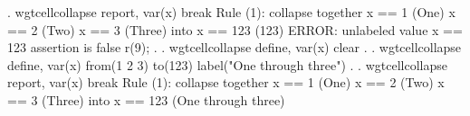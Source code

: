 {\smallskip}
. wgtcellcollapse report, var(x) break
{\smallskip}
Rule (1): collapse together
  x == 1 (One)
  x == 2 (Two)
  x == 3 (Three)
  into x == 123 (123)
  ERROR: unlabeled value x == 123
assertion is false
r(9);
{\smallskip}
.
. wgtcellcollapse define, var(x) clear
{\smallskip}
.
. wgtcellcollapse define, var(x) from(1 2 3) to(123) label("One through three")
{\smallskip}
.
. wgtcellcollapse report, var(x) break
{\smallskip}
Rule (1): collapse together
  x == 1 (One)
  x == 2 (Two)
  x == 3 (Three)
  into x == 123 (One through three)
{\smallskip}
